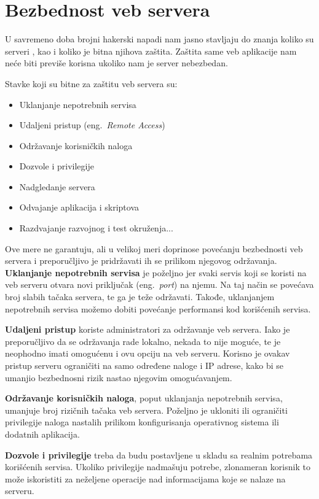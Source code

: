 \documentclass[a4paper]{article}
\begin{document}
\section{Bezbednost veb servera} \label{server}

U savremeno doba brojni hakerski napadi nam jasno stavljaju do znanja koliko su serveri , kao i koliko je bitna njihova zaštita. Zaštita same veb aplikacije nam neće biti previše korisna ukoliko nam je server nebezbedan.

Stavke koji su bitne za zaštitu veb servera su:
\begin{itemize}
	\item Uklanjanje nepotrebnih servisa
	\item Udaljeni pristup (eng.~{\em Remote Access})
	\item Održavanje korisničkih naloga
	\item Dozvole i privilegije
	\item Nadgledanje servera
	\item Odvajanje aplikacija i skriptova
	\item Razdvajanje razvojnog i test okruženja...
\end{itemize}
Ove mere ne garantuju, ali u velikoj meri doprinose povećanju bezbednosti veb servera i preporučljivo je pridržavati ih se prilikom njegovog održavanja.\\

\textbf{Uklanjanje nepotrebnih servisa} je poželjno jer svaki servis koji se koristi na veb serveru otvara novi priključak (eng.~{\em port}) na njemu. Na taj način se povećava broj slabih tačaka servera, te ga je teže održavati. Takođe, uklanjanjem nepotrebnih servisa možemo dobiti povećanje performansi kod korišćenih servisa.

\textbf{Udaljeni pristup} koriste administratori za održavanje veb servera. Iako je preporučljivo da se održavanja rade lokalno, nekada to nije moguće, te je neophodno imati omogućenu i ovu opciju na veb serveru. Korisno je ovakav pristup serveru ograničiti na samo određene naloge i IP adrese, kako bi se umanjio bezbednosni rizik nastao njegovim omogućavanjem.

\textbf{Održavanje korisničkih naloga}, poput uklanjanja nepotrebnih servisa, umanjuje broj rizičnih tačaka veb servera. Poželjno je ukloniti ili ograničiti privilegije naloga nastalih prilikom konfigurisanja operativnog sistema ili dodatnih aplikacija.

\textbf{Dozvole i privilegije} treba da budu postavljene u skladu sa realnim potrebama korišćenih servisa. Ukoliko privilegije nadmašuju potrebe, zlonameran korisnik to može iskoristiti za neželjene operacije nad informacijama koje se nalaze na serveru.
\end{document}

